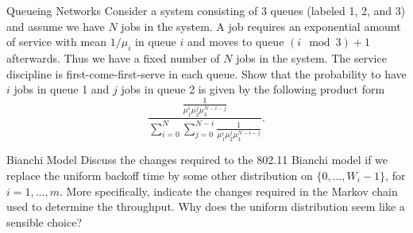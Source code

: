 \begin{problem}{Queueing Networks}
Consider a system consisting of 3 queues (labeled 1, 2, and 3)
and assume we have $N$ jobs in the system. A job requires an exponential amount of
service with mean $1/\mu_i$ in queue $i$ and moves to queue $(i \mod 3) + 1$ afterwards. Thus
we have a fixed number of $N$ jobs in the system. The service discipline is first-come-first-serve in each queue. Show that the probability to have $i$ jobs in queue 1 and $j$ jobs
in queue 2 is given by the following product form
\[
\frac{\frac{1}{\mu_1^i \mu_2^j \mu_3^{N-i-j}}}{\sum_{i=0}^{N} \sum_{j=0}^{N-i} \frac{1}{\mu_1^i \mu_2^j \mu_3^{N-i-j}}}.
\]
\end{problem}

\begin{problem}{Bianchi Model}
Discuss the changes required to the 802.11 Bianchi model if we replace
the uniform backoff time by some other distribution on $\{0, \ldots, W_i -1\}$, for $i = 1, \ldots, m$.
More specifically, indicate the changes required in the Markov chain used to determine
the throughput. Why does the uniform distribution seem like a sensible choice?
\end{problem}
